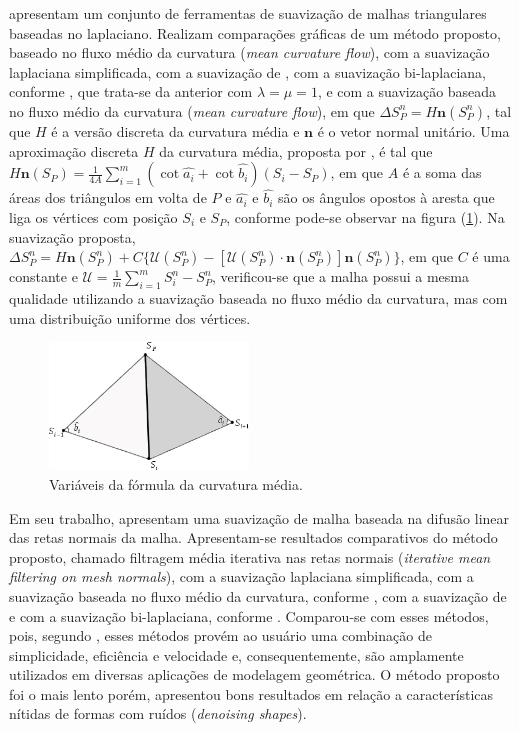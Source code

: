  apresentam um conjunto de ferramentas de suavização de malhas triangulares baseadas no laplaciano. Realizam comparações gráficas de um método proposto, baseado no fluxo médio da curvatura ({\it mean curvature flow}), com a suavização laplaciana simplificada, com a suavização de , com a suavização bi-laplaciana, conforme , que trata-se da anterior com $\lambda = \mu = 1$, e com a suavização baseada no fluxo médio da curvatura ({\it mean curvature flow}), em que $\Delta S_{P}^{n} =  H{\mathbf n}(S_{P}^{n})$, tal que $H$ é a versão discreta da curvatura média e ${\mathbf n}$ é o vetor normal unitário. Uma aproximação discreta $H$ da curvatura média, proposta por , é tal que $H{\mathbf n}(S_{P}) = \frac {1} {4A} \sum_{i=1}^{m} (\cot \hat{a_i} + \cot \hat{b_i}) (S_i - S_P)$, em que $A$ é a soma das áreas dos triângulos em volta de $P$ e $\hat{a_i}$ e $\hat{b_i}$ são os ângulos opostos à aresta que liga os vértices com posição $S_i$ e $S_P$, conforme pode-se observar na figura (\ref{fig_curvatura_media}). Na suavização proposta, $\Delta S_{P}^{n} =  H{\mathbf n}(S_{P}^{n}) + C \{ \mathscr{U} (S_{P}^{n}) - [\mathscr{U} (S_{P}^{n}) \cdot {\mathbf n} (S_{P}^{n}) ] {\mathbf n} (S_{P}^{n}) \} $, em que $C$ é uma constante e  $\mathscr{U} = \frac {1}{m} \sum_{i=1}^{m}S_{i}^{n} - S_{P}^{n}$, verificou-se que a malha possui a mesma qualidade utilizando a suavização baseada no fluxo médio da curvatura, mas com uma distribuição uniforme dos vértices.

\begin{figure}[!ht]
  \centering
  \includegraphics[width=150pt]{imagens_malhas_moveis/curvatura_media.png}
  \caption{\footnotesize{Variáveis da fórmula da curvatura média.
}}
  \label{fig_curvatura_media}
\end{figure}

Em seu trabalho,  apresentam uma suavização de malha baseada na difusão linear das retas normais da malha. Apresentam-se resultados comparativos do método proposto, chamado filtragem média iterativa nas retas normais ({\it iterative mean filtering on mesh normals}), com a suavização laplaciana simplificada, com a suavização baseada no fluxo médio da curvatura, conforme , com a suavização de  e com a suavização bi-laplaciana, conforme . Comparou-se com esses métodos, pois, segundo , esses métodos provém ao usuário uma combinação de simplicidade, eficiência e velocidade e, consequentemente, são amplamente utilizados em diversas aplicações de modelagem geométrica. O método proposto foi o mais lento porém,  apresentou bons resultados em relação a características nítidas de formas com ruídos ({\it denoising shapes}). 

